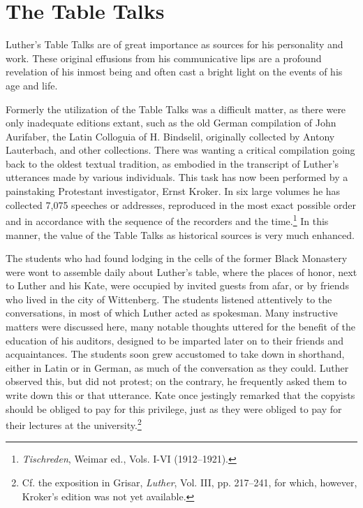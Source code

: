 \section{The Table Talks}

Luther’s Table Talks are of great importance as sources for his
personality and work. These original effusions from his communicative
lips are a profound revelation of his inmost being and often cast a
bright light on the events of his age and life.

Formerly the utilization of the Table Talks was a difficult matter,
as there were only inadequate editions extant, such as the old German
compilation of John Aurifaber, the Latin Colloguia of H. Bindselil,
originally collected by Antony Lauterbach, and other collections.
There was wanting a critical compilation going back to the oldest
textual tradition, as embodied in the transcript of Luther’s utterances
made by various individuals. This task has now been performed by a
painstaking Protestant investigator, Ernst Kroker. In six large volumes
he has collected 7,075 speeches or addresses, reproduced in the
most exact possible order and in accordance with the sequence of the
recorders and the time.\footnote{\textit{Tischreden}, Weimar ed., Vols. I-VI (1912--1921).}
 In this manner, the value of the Table Talks
as historical sources is very much enhanced.

The students who had found lodging in the cells of the former
Black Monastery were wont to assemble daily about Luther’s table,
where the places of honor, next to Luther and his Kate, were occupied
by invited guests from afar, or by friends who lived in the city
of Wittenberg. The students listened attentively to the conversations,
in most of which Luther acted as spokesman. Many instructive matters
were discussed here, many notable thoughts uttered for the benefit of
the education of his auditors, designed to be imparted later on to
their friends and acquaintances. The students soon grew accustomed
to take down in shorthand, either in Latin or in German, as much
of the conversation as they could. Luther observed this, but did not
protest; on the contrary, he frequently asked them to write down
this or that utterance. Kate once jestingly remarked that the copyists
should be obliged to pay for this privilege, just as they were obliged
to pay for their lectures at the university.\footnote
{Cf. the exposition in Grisar, \textit{Luther}, Vol. III, pp. 217--241, for which, however,
Kroker’s edition was not yet available.}

